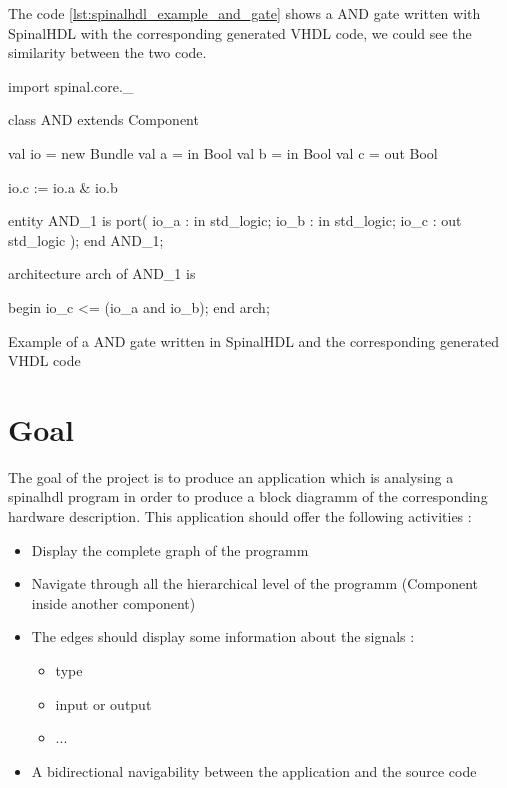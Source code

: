 The code \ref{lst:spinalhdl_example_and_gate} shows a AND gate written with SpinalHDL with the corresponding generated VHDL code, we could see the similarity between the two code.

\begin{listing} %
    \centering
    
    \begin{minipage}[c]{0.45\textwidth}
    \begin{scalacode}
    import spinal.core._

    class AND extends Component
    {
        val io = new Bundle
        {
            val a = in Bool
            val b = in Bool
            val c = out Bool
        }

        io.c := io.a & io.b
    }    
    \end{scalacode}
    \end{minipage}
    \hfill
    \begin{minipage}[c]{0.45\textwidth}
    \begin{vhdlcode}
    entity AND_1 is
        port( 
            io_a : in std_logic;
            io_b : in std_logic;
            io_c : out std_logic 
        );
    end AND_1;

    architecture arch of AND_1 is

    begin
      io_c <= (io_a and io_b);
    end arch;
    \end{vhdlcode}
    \end{minipage}
    \caption{Example of a AND gate written in SpinalHDL and the corresponding generated VHDL code}
    \label{lst:spinalhdl_example_and_gate}
\end{listing} %


\section{Goal} %
\label{sec:Goal}

The goal of the project is to produce an application which is analysing a spinalhdl program in order to produce a block diagramm of the corresponding hardware description. This application should offer the following activities :

\begin{itemize}
    \item Display the complete graph of the programm
    \item Navigate through all the hierarchical level of the programm (Component inside another component)
    \item The edges should display some information about the signals :
    \begin{itemize}
        \item type
        \item input or output
        \item ...
    \end{itemize}
    \item A bidirectional navigability between the application and the source code
\end{itemize}

